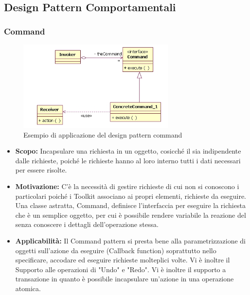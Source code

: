 \documentclass{scalatekids-article}
\begin{document}
\subsection{Design Pattern Comportamentali}

\subsubsection{Command}
\begin{figure}[H]
	\begin{center}
		\includegraphics[width=0.7\textwidth, keepaspectratio]{img/designPattern/CommandPattern.png}
		\caption{Esempio di applicazione del design pattern command}
	\end{center}
\end{figure}
\begin{itemize}
	\item \textbf{Scopo:} Incapsulare una richiesta in un oggetto, cosicché il  sia indipendente dalle richieste, poiché le richieste hanno al loro interno tutti i dati necessari per essere risolte.
\item \textbf{Motivazione:} C'è la necessità di gestire richieste di cui non si conoscono i particolari poiché i Toolkit associano ai propri elementi, richieste da eseguire.
 Una classe astratta, Command, definisce l’interfaccia per eseguire la richiesta che è un semplice oggetto, per cui è possibile rendere variabile la reazione del  senza conoscere i dettagli dell'operazione stessa.
\item \textbf{Applicabilità:} Il Command pattern si presta bene alla parametrizzazione di oggetti sull’azione da eseguire (Callback function) soprattutto nello specificare, accodare ed eseguire richieste molteplici volte. Vi è inoltre il Supporto alle operazioni di "Undo" e "Redo". Vi è inoltre il supporto a transazione in quanto è possibile incapsulare un'azione in una operazione atomica.
\end{itemize}
\end{document}
